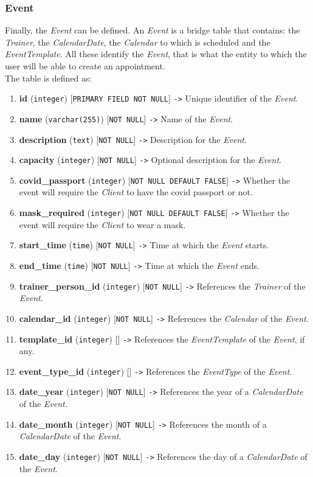 \documentclass[a4paper, 12pt, oneside]{book}
\begin{document}
\subsubsection{Event}
Finally, the \emph{Event} can be defined. An \emph{Event} is a bridge table that contains: the \emph{Trainer}, the \emph{CalendarDate}, the \emph{Calendar} to which is scheduled and the \emph{EventTemplate}. All these identify the \emph{Event}, that is what the entity to which the user will be able to create an appointment.
\\[8pt]
The table is defined as:
\begin{enumerate}[label = -]
	\item \textbf{id} (\texttt{integer}) [\texttt{PRIMARY FIELD NOT NULL}] \texttt{->} Unique identifier of the \emph{Event}.
	\item \textbf{name} (\texttt{varchar(255)}) [\texttt{NOT NULL}] \texttt{->} Name of the \emph{Event}.
	\item \textbf{description} (\texttt{text}) [\texttt{NOT NULL}] \texttt{->} Description for the \emph{Event}.
	\item \textbf{capacity} (\texttt{integer}) [\texttt{NOT NULL}] \texttt{->} Optional description for the \emph{Event}.
	\item \textbf{covid\_passport} (\texttt{integer}) [\texttt{NOT NULL DEFAULT FALSE}] \texttt{->} Whether the event will require the \emph{Client} to have the covid passport or not.
	\item \textbf{mask\_required} (\texttt{integer}) [\texttt{NOT NULL DEFAULT FALSE}] \texttt{->} Whether the event will require the \emph{Client} to wear a mask.
	\item \textbf{start\_time} (\texttt{time}) [\texttt{NOT NULL}] \texttt{->} Time at which the \emph{Event} starts.
	\item \textbf{end\_time} (\texttt{time}) [\texttt{NOT NULL}] \texttt{->} Time at which the \emph{Event} ends.
	\item \textbf{trainer\_person\_id} (\texttt{integer}) [\texttt{NOT NULL}] \texttt{->} References the \emph{Trainer} of the \emph{Event}.
	\item \textbf{calendar\_id} (\texttt{integer}) [\texttt{NOT NULL}] \texttt{->} References the \emph{Calendar} of the \emph{Event}.
	\item \textbf{template\_id} (\texttt{integer}) [] \texttt{->} References the \emph{EventTemplate} of the \emph{Event}, if any.
	\item \textbf{event\_type\_id} (\texttt{integer}) [] \texttt{->} References the \emph{EventType} of the \emph{Event}.
	\item \textbf{date\_year} (\texttt{integer}) [\texttt{NOT NULL}] \texttt{->} References the year of a \emph{CalendarDate} of the \emph{Event}.
	\item \textbf{date\_month} (\texttt{integer}) [\texttt{NOT NULL}] \texttt{->} References the month of a \emph{CalendarDate} of the \emph{Event}.
	\item \textbf{date\_day} (\texttt{integer}) [\texttt{NOT NULL}] \texttt{->} References the day of a \emph{CalendarDate} of the \emph{Event}.
\end{enumerate}
\end{document}
